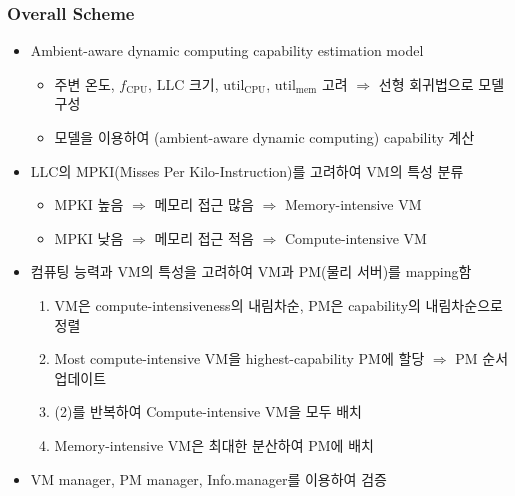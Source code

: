 \subsubsection*{Overall Scheme}
\begin{itemize}
    \item Ambient-aware dynamic computing capability estimation model
    \begin{itemize}
        \item 주변 온도, $f_\mathrm{CPU}$, LLC 크기, $\mathrm{util_{CPU}}$, $\mathrm{util_{mem}}$ 고려 $\Rightarrow$ 선형 회귀법으로 모델 구성
        \item 모델을 이용하여 (ambient-aware dynamic computing) capability 계산
    \end{itemize}
    \item LLC의 MPKI(Misses Per Kilo-Instruction)를 고려하여 VM의 특성 분류
    \begin{itemize}
        \item MPKI 높음 $\Rightarrow$ 메모리 접근 많음 $\Rightarrow$ Memory-intensive VM
        \item MPKI 낮음 $\Rightarrow$ 메모리 접근 적음 $\Rightarrow$ Compute-intensive VM
    \end{itemize}
    \item 컴퓨팅 능력과 VM의 특성을 고려하여 VM과 PM(물리 서버)를 mapping함
    \begin{enumerate}
        \item VM은 compute-intensiveness의 내림차순, PM은 capability의 내림차순으로 정렬
        \item Most compute-intensive VM을 highest-capability PM에 할당 $\Rightarrow$ PM 순서 업데이트
        \item (2)를 반복하여 Compute-intensive VM을 모두 배치
        \item Memory-intensive VM은 최대한 분산하여 PM에 배치
    \end{enumerate}
    \item VM manager, PM manager, Info.manager를 이용하여 검증
\end{itemize}


